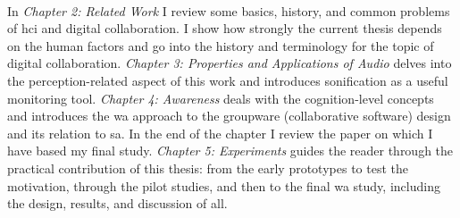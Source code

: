 \paragraph[Overview]{}
In \textit{Chapter 2: Related Work} I review some basics, history, and common problems of \gls{hci} and digital collaboration. I show how strongly the current thesis depends on the human factors and go into the history and terminology for the topic of digital collaboration. 
\textit{Chapter 3: Properties and Applications of Audio} delves into the perception-related aspect of this work and introduces sonification as a useful monitoring tool. \textit{Chapter 4: Awareness} deals with the cognition-level concepts and introduces the \gls{wa} approach to the groupware (collaborative software) design and its relation to \gls{sa}. In the end of the chapter I review the paper on which I have based my final study. \textit{Chapter 5: Experiments} guides the reader through the practical contribution of this thesis: from the early prototypes to test the motivation, through the pilot studies, and then to the final \gls{wa} study, including the design, results, and discussion of all.

